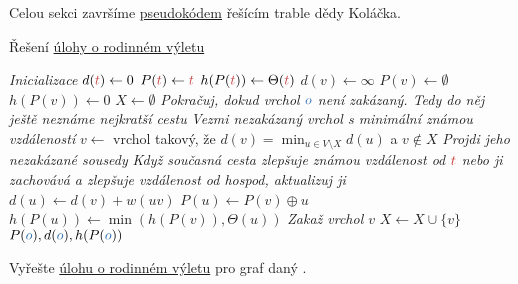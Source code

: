 Celou sekci završíme \hyperref[alg:rodinny-vylet]{pseudokódem} řešícím trable
dědy Koláčka.

\begin{algorithm}
  \caption{Řešení \hyperref[prob:rodinny-vylet]{úlohy o rodinném výletu}}
  \label{alg:rodinny-vylet}


  \BlankLine
  \emph{Inicializace}\;
  $d(\clr{t}) \leftarrow 0$\;
  $P(\clr{t}) \leftarrow \clr{t}$\;
  $h(P(\clr{t})) \leftarrow \Theta(\clr{t})$\;
   {
   $d(v) \leftarrow \infty$\;
   $P(v) \leftarrow \emptyset$\;
   $h(P(v)) \leftarrow 0$\;
  }
  $X \leftarrow \emptyset$\;
  \BlankLine
  \emph{Pokračuj, dokud vrchol $\clb{o}$ není zakázaný. Tedy do něj ještě
  neznáme nejkratší cestu}\;
   {
   \emph{Vezmi nezakázaný vrchol s minimální známou vzdáleností}\;
   $v \leftarrow $ vrchol takový, že $d(v) = \min_{u \in V \setminus X} d(u)$ a
   $v \notin X$\;
   \emph{Projdi jeho nezakázané sousedy}\;
    {
    \emph{Když současná cesta zlepšuje známou vzdálenost od $\clr{t}$ nebo ji
    zachovává a zlepšuje vzdálenost od hospod, aktualizuj ji}\;
     {
     $d(u) \leftarrow d(v) + w(uv)$\;
     $P(u) \leftarrow P(v) \oplus u$\;
     $h(P(u)) \leftarrow \min(h(P(v)),\Theta(u))$\;
    }
    \emph{Zakaž vrchol $v$}\;
    $X \leftarrow X \cup \{v\}$\;
   }
   \KwReturn $P(\clb{o}),d(\clb{o}),h(P(\clb{o}))$\;
  }
\end{algorithm}

\pagebreak

\begin{exercise}
 Vyřešte \hyperref[prob:rodinny-vylet]{úlohu o rodinném výletu} pro graf daný
 .
\end{exercise}
